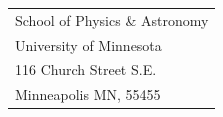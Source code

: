 \documentclass[11pt]{article}
\begin{document}

\begin{tabular}{@{}l@{}}
School of Physics \& Astronomy \\
 University of Minnesota \\
116 Church Street S.E. \\
Minneapolis MN, 55455
\end{tabular}




\end{document}
